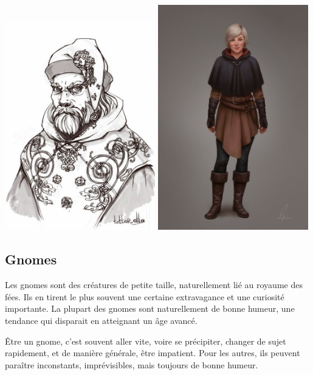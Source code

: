 \documentclass[10pt,a4paper]{book}
\begin{document}
\includegraphics[width=0.49\textwidth]{humain 1}
\includegraphics[width=0.49\textwidth]{humaine 2}
\subsection{Gnomes}
Les gnomes sont des créatures de petite taille, naturellement lié au royaume des fées. Ils en tirent le plus souvent une certaine extravagance et une curiosité importante. La plupart des gnomes sont naturellement de bonne humeur, une tendance qui disparait en atteignant un âge avancé.

Être un gnome, c'est souvent aller vite, voire se précipiter, changer de sujet rapidement, et de manière générale, être impatient. Pour les autres, ils peuvent paraître inconstants, imprévisibles, mais toujours de bonne humeur.
\end{document}
